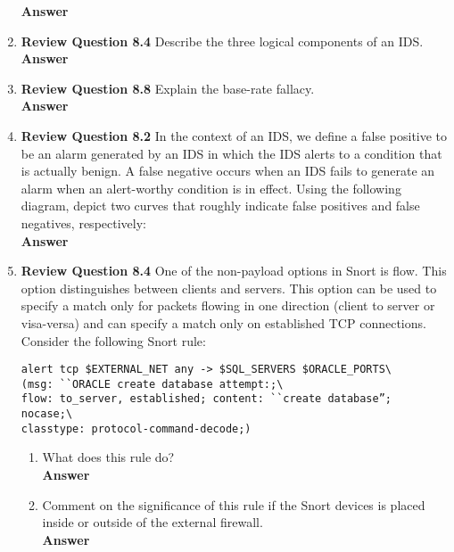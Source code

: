 \documentclass[12pt]{article}
\begin{document}
\begin{enumerate}
\textbf{Answer} \\

\item \textbf{Review Question 8.4} Describe the three logical components of an IDS.\\

\textbf{Answer} \\

\item \textbf{Review Question 8.8} Explain the base-rate fallacy.\\

\textbf{Answer} \\

\item \textbf{Review Question 8.2} In the context of an IDS, we define a false positive to be an alarm generated by an IDS in which the IDS alerts to a condition that is actually benign. A false negative occurs when an IDS fails to generate an alarm when an alert-worthy condition is in effect. Using the following diagram, depict two curves that roughly indicate false positives and false negatives, respectively:\\

\textbf{Answer} \\

\item \textbf{Review Question 8.4} One of the non-payload options in Snort is flow. This option distinguishes between clients and servers. This option can be used to specify a match only for packets flowing in one direction (client to server or visa-versa) and can specify a match only on established TCP connections. Consider the following Snort rule: \\

{\color{blue}
\begin{verbatim}
alert tcp $EXTERNAL_NET any -> $SQL_SERVERS $ORACLE_PORTS\
(msg: ``ORACLE create database attempt:;\
flow: to_server, established; content: ``create database”;
nocase;\
classtype: protocol-command-decode;)
\end{verbatim}
}

\begin{enumerate}
\item {What does this rule do?} \\

\textbf{Answer} \\

\item {Comment on the significance of this rule if the Snort devices is placed inside or outside of the external firewall.} \\

\textbf{Answer} \\

\end{enumerate}


\end{enumerate}
\end{document}
